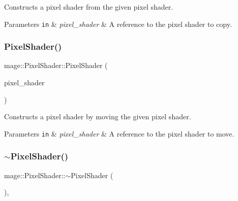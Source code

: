 Constructs a pixel shader from the given pixel shader.


\begin{DoxyParams}[1]{Parameters}
\mbox{\tt in}  & {\em pixel\+\_\+shader} & A reference to the pixel shader to copy. \\
\hline
\end{DoxyParams}
\hypertarget{classmage_1_1_pixel_shader_a5b2d7d36082d25c6f860674df745f7cd}{}\label{classmage_1_1_pixel_shader_a5b2d7d36082d25c6f860674df745f7cd} 
\subsubsection{\texorpdfstring{Pixel\+Shader()}{PixelShader()}\hspace{0.1cm}{\footnotesize\ttfamily [6/6]}}
{\footnotesize\ttfamily mage\+::\+Pixel\+Shader\+::\+Pixel\+Shader (\begin{DoxyParamCaption}\item[{\hyperlink{classmage_1_1_pixel_shader}{Pixel\+Shader} \&\&}]{pixel\+\_\+shader }\end{DoxyParamCaption})\hspace{0.3cm}{\ttfamily [default]}}

Constructs a pixel shader by moving the given pixel shader.


\begin{DoxyParams}[1]{Parameters}
\mbox{\tt in}  & {\em pixel\+\_\+shader} & A reference to the pixel shader to move. \\
\hline
\end{DoxyParams}
\hypertarget{classmage_1_1_pixel_shader_aac21a59d5d614f5bf1905f01479de44e}{}\label{classmage_1_1_pixel_shader_aac21a59d5d614f5bf1905f01479de44e} 
\subsubsection{\texorpdfstring{$\sim$\+Pixel\+Shader()}{~PixelShader()}}
{\footnotesize\ttfamily mage\+::\+Pixel\+Shader\+::$\sim$\+Pixel\+Shader (\begin{DoxyParamCaption}{ }\end{DoxyParamCaption})\hspace{0.3cm}{\ttfamily [virtual]}, {\ttfamily [default]}}

